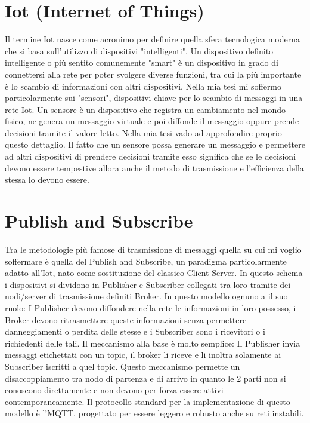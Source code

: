 \documentclass[12pt,a4paper,openright,oneside]{book} %
\begin{document}
\section{Iot (Internet of Things)}
Il termine Iot nasce come acronimo per definire quella sfera tecnologica moderna che si basa sull'utilizzo di dispositivi "intelligenti".
Un dispositivo definito intelligente o più sentito comunemente "smart" è un dispositivo in grado di connettersi alla rete per poter svolgere diverse funzioni, tra cui la più importante è lo scambio di informazioni con altri dispositivi.
Nella mia tesi mi soffermo particolarmente sui "sensori", dispositivi chiave per lo scambio di messaggi in una rete Iot.
Un sensore è un dispositivo che registra un cambiamento nel mondo fisico, ne genera un messaggio virtuale e poi diffonde il messaggio oppure prende decisioni tramite il valore letto.
Nella mia tesi vado ad approfondire proprio questo dettaglio.
Il fatto che un sensore possa generare un messaggio e permettere ad altri dispositivi di prendere decisioni tramite esso significa che se le decisioni devono essere tempestive allora anche il metodo di trasmissione e l'efficienza della stessa lo devono essere.
\section{Publish and Subscribe}
Tra le metodologie più famose di trasmissione di messaggi quella su cui mi voglio soffermare è quella del Publish and Subscribe, un paradigma particolarmente adatto all'Iot, nato come sostituzione del classico Client-Server. In questo schema i dispositivi si dividono in Publisher e Subscriber collegati tra loro tramite dei nodi/server di trasmissione definiti Broker.
In questo modello ognuno a il suo ruolo: I Publisher devono diffondere nella rete le informazioni in loro possesso, i Broker devono ritrasmettere queste informazioni senza permettere danneggiamenti o perdita delle stesse e i Subscriber sono i ricevitori o i richiedenti delle tali.
Il meccanismo alla base è molto semplice: Il Publisher invia messaggi etichettati con un topic, il broker li riceve e li inoltra solamente ai Subscriber iscritti a quel topic. Questo meccanismo permette un disaccoppiamento tra nodo di partenza e di arrivo in quanto le 2 parti non si conoscono direttamente e non devono per forza essere attivi contemporaneamente.
Il protocollo standard per la implementazione di questo modello è l'MQTT, progettato per essere leggero e robusto anche su reti instabili.
\end{document}
